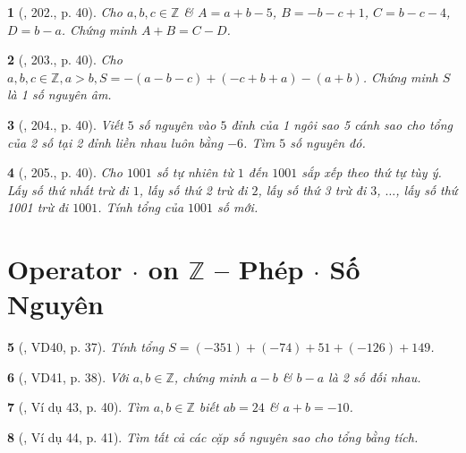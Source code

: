 \documentclass{article}
\newtheorem{baitoan}{}
\begin{document}
\begin{baitoan}[\cite{Tuyen_Toan_6}, 202., p. 40]
	Cho $a,b,c\in\mathbb{Z}$ \& $A = a + b - 5$, $B = -b - c + 1$, $C = b - c - 4$, $D = b - a$. Chứng minh $A + B = C - D$.
\end{baitoan}

\begin{baitoan}[\cite{Tuyen_Toan_6}, 203., p. 40]
	Cho $a,b,c\in\mathbb{Z},a > b,S = -(a - b - c) + (-c + b + a) - (a + b)$. Chứng minh $S$ là 1 số nguyên âm.
\end{baitoan}

\begin{baitoan}[\cite{Tuyen_Toan_6}, 204., p. 40]
	Viết $5$ số nguyên vào $5$ đỉnh của 1 ngôi sao 5 cánh sao cho tổng của 2 số tại 2 đỉnh liền nhau luôn bằng $-6$. Tìm $5$ số nguyên đó.
\end{baitoan}

\begin{baitoan}[\cite{Tuyen_Toan_6}, 205., p. 40]
	Cho $1001$ số tự nhiên từ $1$ đến $1001$ sắp xếp theo thứ tự tùy ý. Lấy số thứ nhất trừ đi $1$, lấy số thứ 2 trừ đi $2$, lấy số thứ 3 trừ đi $3$, $\ldots$, lấy số thứ 1001 trừ đi $1001$. Tính tổng của $1001$ số mới.
\end{baitoan}


\section{Operator $\cdot$ on $\mathbb{Z}$ -- Phép $\cdot$ Số Nguyên}

\begin{baitoan}[\cite{Tuyen_Toan_6}, VD40, p. 37]
	Tính tổng $S = (-351) + (-74) + 51 + (-126) + 149$.
\end{baitoan}

\begin{baitoan}[\cite{Tuyen_Toan_6}, VD41, p. 38]
	Với $a,b\in\mathbb{Z}$, chứng minh $a - b$ \& $b - a$ là 2 số đối nhau.
\end{baitoan}

\begin{baitoan}[\cite{Tuyen_Toan_6}, Ví dụ 43, p. 40]
	Tìm $a,b\in\mathbb{Z}$ biết $ab = 24$ \& $a + b = -10$.
\end{baitoan}

\begin{baitoan}[\cite{Tuyen_Toan_6}, Ví dụ 44, p. 41]
	Tìm tất cả các cặp số nguyên sao cho tổng bằng tích.
\end{baitoan}
\end{document}
